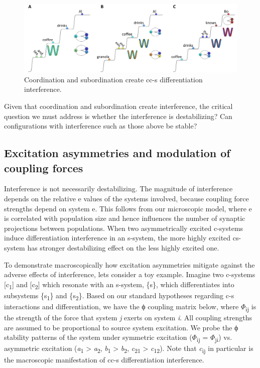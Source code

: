  
\begin{figure}
\includegraphics[width=\textwidth]{figures/Tilsen-img94.png}
\caption{Coordination and subordination create cc-s differentiation interference.}
\label{fig:4:44}
\end{figure}
 

  Given that coordination and subordination create interference, the critical question we must address is whether the interference is destabilizing? Can configurations with interference such as those above be stable? 

\subsection{Excitation asymmetries and modulation of coupling forces}

Interference is not necessarily destabilizing. The magnitude of interference depends on the relative e values of the systems involved, because coupling force strengths depend on system e. This follows from our microscopic model, where e is correlated with population size and hence influences the number of synaptic projections between populations. When two asymmetrically excited c-systems induce differentiation interference in an s-system, the more highly excited cs-system has stronger destabilizing effect on the less highly excited one.

  To demonstrate macroscopically how excitation asymmetries mitigate against the adverse effects of interference, lets consider a toy example. Imagine two c-systems [c\textsubscript{1}] and [c\textsubscript{2}] which resonate with an s-system, \{s\}, which differentiates into subsystems \{s\textsubscript{1}\} and \{s\textsubscript{2}\}. Based on our standard hypotheses regarding c-s interactions and differentiation, we have the ϕ coupling matrix below, where $\Phi$\textsubscript{ij} is the strength of the force that system \textit{j} exerts on system \textit{i}. All coupling strengths are assumed to be proportional to source system excitation. We probe the ϕ stability patterns of the system under symmetric excitation ($\Phi$\textsubscript{ij} = $\Phi$\textsubscript{ji}) vs. asymmetric excitation (\textit{a}\textsubscript{1} > \textit{a}\textsubscript{2}, \textit{b}\textsubscript{1} > \textit{b}\textsubscript{2}, \textit{c}\textsubscript{21} > \textit{c}\textsubscript{12}). Note that \textit{c}\textsubscript{ij} in particular is the macroscopic manifestation of cc-s differentiation interference.

